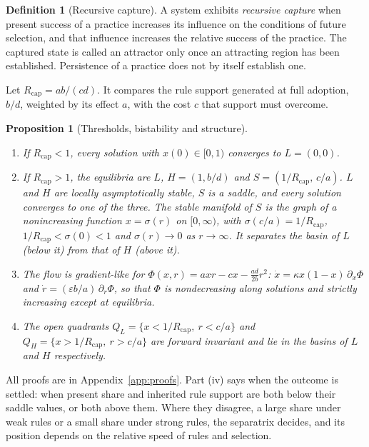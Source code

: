 \documentclass[11pt]{article}
\theoremstyle{plain}
\newtheorem{proposition}{Proposition}
\theoremstyle{definition}
\newtheorem{definition}{Definition}
\newcommand{\Rcap}{R_{\mathrm{cap}}}
\begin{document}
\begin{definition}[Recursive capture]\label{def:capture}
A system exhibits \emph{recursive capture} when present success of a practice increases its influence on the conditions of future selection, and that influence increases the relative success of the practice. The captured state is called an attractor only once an attracting region has been established. Persistence of a practice does not by itself establish one.
\end{definition}

Let $\Rcap=ab/(cd)$. It compares the rule support generated at full adoption, $b/d$, weighted by its effect $a$, with the cost $c$ that support must overcome.

\begin{proposition}[Thresholds, bistability and structure]\label{prop:capture}
\begin{enumerate}[label=(\roman*),leftmargin=*]
\item If $\Rcap<1$, every solution with $x(0)\in[0,1)$ converges to $L=(0,0)$.
\item If $\Rcap>1$, the equilibria are $L$, $H=(1,b/d)$ and $S=(1/\Rcap,\,c/a)$. $L$ and $H$ are locally asymptotically stable, $S$ is a saddle, and every solution converges to one of the three. The stable manifold of $S$ is the graph of a nonincreasing function $x=\sigma(r)$ on $[0,\infty)$, with $\sigma(c/a)=1/\Rcap$, $1/\Rcap<\sigma(0)<1$ and $\sigma(r)\to0$ as $r\to\infty$. It separates the basin of $L$ (below it) from that of $H$ (above it).
\item The flow is gradient-like for $\Phi(x,r)=axr-cx-\tfrac{ad}{2b}r^2$: $\dot x=\kappa x(1-x)\,\partial_x\Phi$ and $\dot r=(\varepsilon b/a)\,\partial_r\Phi$, so that $\Phi$ is nondecreasing along solutions and strictly increasing except at equilibria.
\item The open quadrants $Q_L=\{x<1/\Rcap,\ r<c/a\}$ and $Q_H=\{x>1/\Rcap,\ r>c/a\}$ are forward invariant and lie in the basins of $L$ and $H$ respectively.
\end{enumerate}
\end{proposition}

All proofs are in Appendix~\ref{app:proofs}. Part (iv) says when the outcome is settled: when present share and inherited rule support are both below their saddle values, or both above them. Where they disagree, a large share under weak rules or a small share under strong rules, the separatrix decides, and its position depends on the relative speed of rules and selection.
\end{document}
